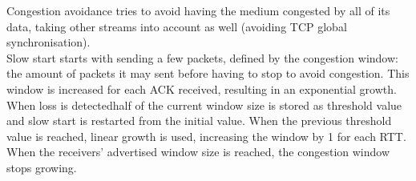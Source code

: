 Congestion avoidance tries to avoid having the medium congested by all of its data, taking other streams into account as well (avoiding TCP global synchronisation).\\
Slow start starts with sending a few packets, defined by the congestion window: the amount of packets it may sent before having to stop to avoid congestion. This window is increased for each ACK received, resulting in an exponential growth.\\ When loss is detectedhalf of the current window size is stored as threshold value and slow start is restarted from the initial value. When the previous threshold value is reached, linear growth is used, increasing the window by 1 for each RTT. \\
When the receivers' advertised window size is reached, the congestion window stops growing.